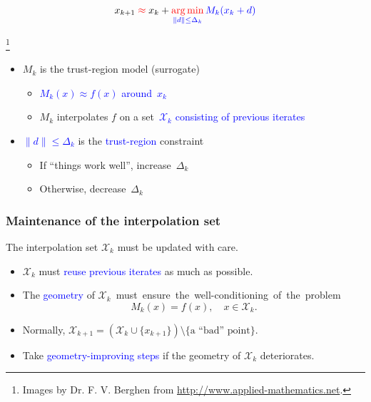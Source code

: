 \documentclass[slidestop,mathserif,xcolor=dvipsnames]{beamer}
\newcommand\blfootnote[1]{%
  \begingroup
  \renewcommand\thefootnote{}\footnote{#1}%
  \addtocounter{footnote}{-1}%
  \endgroup
}
\newcommand{\blue}[1]{\textcolor{blue}{#1}}
\newcommand{\red}[1]{\textcolor{red}{#1}}
\DeclareMathOperator*{\rargmin}{\textcolor{red}{arg\,min}}
\begin{document}
\begin{frame}
    \hspace{2.25cm}
    \begin{beamerboxesrounded}[width=7cm,shadow=true]{}
    \begin{equation*}
        x_{k+1} \;\red{\approx}\; x_k + \rargmin_{\blue{\|d\|\le \Delta_k}}
      \blue{M_k(x_k+d)}
    \end{equation*}
    \end{beamerboxesrounded}
    \blfootnote{Images by Dr. F. V. Berghen from \url{http://www.applied-mathematics.net}.}
    \vspace{0.2ex}
\begin{itemize}
  \item $M_k$ is the trust-region model  (surrogate)
    \begin{itemize}
        \item \blue{$M_k(x)\approx f(x)$ around~$x_k$}
      \item  $M_k$ interpolates $f$ on a set~\blue{$\mathcal{X}_k$ consisting of previous iterates}
    \end{itemize}
\vspace{0.6ex}
  \item \blue{$\|d\|\le\Delta_k$} is the \blue{trust-region} constraint
      \begin{itemize}
          \item If ``things work well'', increase~$\Delta_k$
          \item Otherwise, decrease~$\Delta_k$
          \end{itemize}
\end{itemize}

\end{frame}


\begin{frame}
    \frametitle{Maintenance of the interpolation set}
    \vspace{2ex}
    The interpolation set $\mathcal{X}_k$ must be updated with care.
    \vspace{1ex}
    \begin{itemize}
        \item $\mathcal{X}_k$ must \blue{reuse previous iterates} as much as possible.
    \vspace{1ex}
\item The \blue{geometry} of \mbox{$\mathcal{X}_k$ must ensure the well-conditioning of~the~problem}
            \[
                M_k(x) = f(x), \quad x \in \mathcal{X}_k.
            \]
\item Normally, $\mathcal{X}_{k+1} = \left(\mathcal{X}_{k}\cup\{x_{k+1}\}\right) \setminus\{\text{a ``bad'' point}\}$.
    \vspace{1ex}
\item Take \blue{geometry-improving steps} if the geometry of $\mathcal{X}_k$ deteriorates.
    \end{itemize}
\end{frame}
\end{document}
